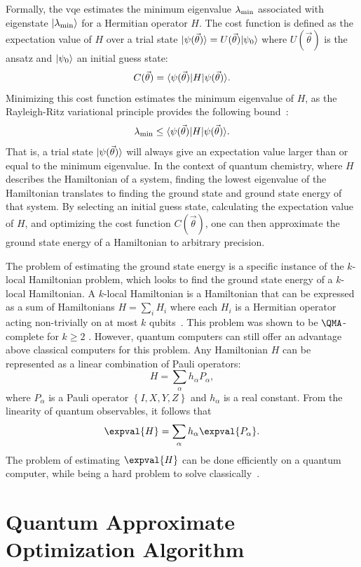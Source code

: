 Formally, the \gls{vqe} estimates the minimum eigenvalue $\lambda_{\textnormal{min}}$ associated with eigenstate $\vert{\lambda_{\textnormal{min}}}\rangle$ for a Hermitian operator $H$.
The cost function is defined as the expectation value of $H$ over a trial state $\vert{\psi({\vec{\theta}})}\rangle = U(\vec{\theta})\vert{\psi_0}\rangle$ where $U(\vec{\theta})$ is the ansatz and $\vert{\psi_0}\rangle$ an initial guess state:
\begin{equation}
C(\vec{\theta}) = \langle{\psi(\vec{\theta})}\vert H\vert{\psi(\vec{\theta})}\rangle.
\end{equation}
Minimizing this cost function estimates the minimum eigenvalue of $H$, as the Rayleigh-Ritz variational principle provides the following bound~\cite{ritz1909neue}:
\begin{equation}
\lambda_{\textnormal{min}} \leq \langle{\psi(\vec{\theta})}\vert H\vert{\psi(\vec{\theta})}\rangle.
\end{equation}
That is, a trial state $\vert{\psi({\vec{\theta}})}\rangle$ will always give an expectation value larger than or equal to the minimum eigenvalue.
In the context of quantum chemistry, where $H$ describes the Hamiltonian of a system, finding the lowest eigenvalue of the Hamiltonian translates to finding the ground state and ground state energy of that system.
By selecting an initial guess state, calculating the expectation value of $H$, and optimizing the cost function $C(\vec{\theta})$, one can then approximate the ground state energy of a Hamiltonian to arbitrary precision.

The problem of estimating the ground state energy is a specific instance of the $k$-local Hamiltonian problem, which looks to find the ground state energy of a $k$-local Hamiltonian.
A $k$-local Hamiltonian is a Hamiltonian that can be expressed as a sum of Hamiltonians $H = \sum_{i}H_i$ where each $H_i$ is a Hermitian operator acting non-trivially on at most $k$ qubits~\cite{bookatz2012qma}.
This problem was shown to be $\QMA$-complete for $k \geq 2$ \cite{kempe2006complexity}.
However, quantum computers can still offer an advantage above classical computers for this problem.
Any Hamiltonian $H$ can be represented as a linear combination of Pauli operators:
\begin{equation}
H = \sum_\alpha h_\alpha P_\alpha,
\end{equation} 
where $P_\alpha$ is a Pauli operator $\left\{I, X, Y, Z\right\}$ and $h_\alpha$ is a real constant.
From the linearity of quantum observables, it follows that
\begin{equation}
\expval{H} = \sum_\alpha h_\alpha \expval{P_\alpha}.
\end{equation} 
The problem of estimating $\expval{H}$ can be done efficiently on a quantum computer, while being a hard problem to solve classically~\cite{ortiz2001quantum, peruzzo2014variational, kandala2017hardware}.


\section{Quantum Approximate Optimization Algorithm}